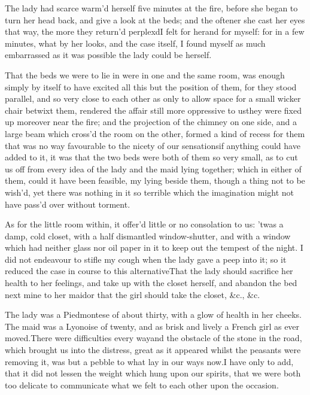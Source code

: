 \documentclass[twoside]{article}
\begin{document}
The lady had scarce warm’d herself five
minutes at the fire, before she began to
turn her head back, and give a look at the
beds; and the oftener she cast her eyes
that way, the more they return’d
perplexd\tskk I felt for her\tskk and for
myself: for in a few minutes, what by her
looks, and the case itself, I found myself
as much embarrassed as it was possible the
lady could be herself.

That the beds we were to lie in were in
one and the same room, was enough simply
by itself to have excited all this\tskk
but the position of them, for they stood
parallel, and so very close to each other
as only to allow space for a small wicker
chair betwixt them, rendered the affair
still more oppressive to us\tskk they
were fixed up moreover near the fire; and
the projection of the chimney on one side,
and a large beam which cross’d the room on
the other, formed a kind of recess for
them that was no way favourable to the
nicety of our sensations\tskk if anything
could have added to it, it was that the
two beds were both of them so very small,
as to cut us off from every idea of the
lady and the maid lying together; which in
either of them, could it have been
feasible, my lying beside them, though a
thing not to be wish’d, yet there was
nothing in it so terrible which the
imagination might not have pass’d over
without torment.

As for the little room within, it offer’d
little or no consolation to us: ’twas a
damp, cold closet, with a half dismantled
window-shutter, and with a window which
had neither glass nor oil paper in it to
keep out the tempest of the night.  I did
not endeavour to stifle my cough when the
lady gave a peep into it; so it reduced
the case in course to this
alternative\tskk That the lady should
sacrifice her health to her feelings, and
take up with the closet herself, and
abandon the bed next mine to her
maid\tskk or that the girl should take
the closet, \&c., \&c.

The lady was a Piedmontese of about
thirty, with a glow of health in her
cheeks.  The maid was a Lyonoise of
twenty, and as brisk and lively a French
girl as ever moved.\tskk There were
difficulties every way\tskk and the
obstacle of the stone in the road, which
brought us into the distress, great as it
appeared whilst the peasants were removing
it, was but a pebble to what lay in our
ways now.\tskk I have only to add, that it
did not lessen the weight which hung upon
our spirits, that we were both too
delicate to communicate what we felt to
each other upon the occasion.
\end{document}
